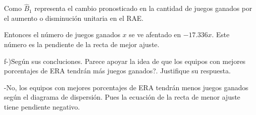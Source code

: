 \documentclass{article}
\begin{document}
		\begin{flushleft}
			Como $\hat B_{1}$ representa el cambio pronosticado en la cantidad de juegos ganados por el aumento o disminuci\'on unitaria en el RAE.
		\end{flushleft}

		\begin{flushleft}
			Entonces el n\'umero de juegos ganados $x$ se ve afentado en $-17.336 x$. Este n\'umero es la pendiente de la recta de mejor ajuste.
		\end{flushleft}

		\begin{flushleft}
			f-)Seg\'un sus concluciones. \textquestiondown Parece apoyar la idea de que los equipos con mejores porcentajes de ERA tendr\'an m\'as juegos ganados?. Justifique su respuesta. 
		\end{flushleft}

		\begin{flushleft}
			-No, los equipos con mejores porcentajes de ERA tendr\'an menos juegos ganados seg\'un el diagrama de dispersi\'on. Pues la ecuaci\'on de la recta de menor ajuste tiene pendiente negativo.
		\end{flushleft}
		
\end{document}
